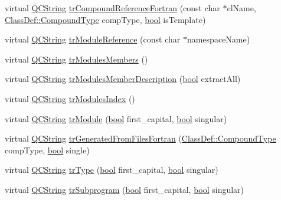 \begin{DoxyCompactItemize}
\item 
virtual \hyperlink{class_q_c_string}{Q\+C\+String} \hyperlink{class_translator_dutch_a80dda8a8d888ab1eb8dadc4670eb1d2a}{tr\+Compound\+Reference\+Fortran} (const char $\ast$cl\+Name, \hyperlink{class_class_def_ae70cf86d35fe954a94c566fbcfc87939}{Class\+Def\+::\+Compound\+Type} comp\+Type, \hyperlink{qglobal_8h_a1062901a7428fdd9c7f180f5e01ea056}{bool} is\+Template)
\item 
virtual \hyperlink{class_q_c_string}{Q\+C\+String} \hyperlink{class_translator_dutch_aa5d2344603e4edcc45d0af70934cb1c6}{tr\+Module\+Reference} (const char $\ast$namespace\+Name)
\item 
virtual \hyperlink{class_q_c_string}{Q\+C\+String} \hyperlink{class_translator_dutch_abcb1ad6c28db1692ac8fb1446711ed42}{tr\+Modules\+Members} ()
\item 
virtual \hyperlink{class_q_c_string}{Q\+C\+String} \hyperlink{class_translator_dutch_a086e97ab20b6f54418a90b74c838c78e}{tr\+Modules\+Member\+Description} (\hyperlink{qglobal_8h_a1062901a7428fdd9c7f180f5e01ea056}{bool} extract\+All)
\item 
virtual \hyperlink{class_q_c_string}{Q\+C\+String} \hyperlink{class_translator_dutch_a073a86f41761e64a30bc9dee76d35d8b}{tr\+Modules\+Index} ()
\item 
virtual \hyperlink{class_q_c_string}{Q\+C\+String} \hyperlink{class_translator_dutch_aa6ddadc6424b2a267dad61e354b50489}{tr\+Module} (\hyperlink{qglobal_8h_a1062901a7428fdd9c7f180f5e01ea056}{bool} first\+\_\+capital, \hyperlink{qglobal_8h_a1062901a7428fdd9c7f180f5e01ea056}{bool} singular)
\item 
virtual \hyperlink{class_q_c_string}{Q\+C\+String} \hyperlink{class_translator_dutch_a55f64a625262ae9b478a5cb7047231b2}{tr\+Generated\+From\+Files\+Fortran} (\hyperlink{class_class_def_ae70cf86d35fe954a94c566fbcfc87939}{Class\+Def\+::\+Compound\+Type} comp\+Type, \hyperlink{qglobal_8h_a1062901a7428fdd9c7f180f5e01ea056}{bool} single)
\item 
virtual \hyperlink{class_q_c_string}{Q\+C\+String} \hyperlink{class_translator_dutch_a565beafed04a4af76616012db83b66c9}{tr\+Type} (\hyperlink{qglobal_8h_a1062901a7428fdd9c7f180f5e01ea056}{bool} first\+\_\+capital, \hyperlink{qglobal_8h_a1062901a7428fdd9c7f180f5e01ea056}{bool} singular)
\item 
virtual \hyperlink{class_q_c_string}{Q\+C\+String} \hyperlink{class_translator_dutch_a8903fb6229a9c0ff86f762476a0c05f5}{tr\+Subprogram} (\hyperlink{qglobal_8h_a1062901a7428fdd9c7f180f5e01ea056}{bool} first\+\_\+capital, \hyperlink{qglobal_8h_a1062901a7428fdd9c7f180f5e01ea056}{bool} singular)

\end{DoxyCompactItemize}
